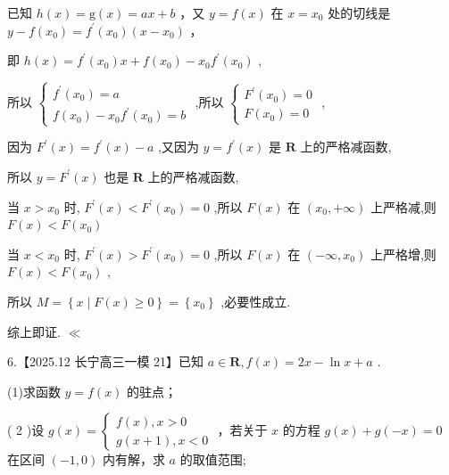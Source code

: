 \documentclass[10pt]{article}
\newcommand*\circled[1]{\tikz[baseline=(char.base)]{\node[shape=circle,draw,inner sep=1.5pt] (char) {\small #1};}}
\begin{document}
 \circled{2}  已知 \(h\left( x\right)  = \mathrm{g}\left( x\right)  = {ax} + b\) ，又 \(y = f\left( x\right)\) 在 \(x = {x}_{0}\) 处的切线是 \(y - f\left( {x}_{0}\right)  = {f}^{\prime }\left( {x}_{0}\right) \left( {x - {x}_{0}}\right)\) ，

即 \(h\left( x\right)  = {f}^{\prime }\left( {x}_{0}\right) x + f\left( {x}_{0}\right)  - {x}_{0}{f}^{\prime }\left( {x}_{0}\right)\) ,

所以 \(\left\{  \begin{array}{l} {f}^{\prime }\left( {x}_{0}\right)  = a \\  f\left( {x}_{0}\right)  - {x}_{0}{f}^{\prime }\left( {x}_{0}\right)  = b \end{array}\right.\) ,所以 \(\left\{  \begin{array}{l} {F}^{\prime }\left( {x}_{0}\right)  = 0 \\  F\left( {x}_{0}\right)  = 0 \end{array}\right.\) ,

因为 \({F}^{\prime }\left( x\right)  = {f}^{\prime }\left( x\right)  - a\) ,又因为 \(y = {f}^{\prime }\left( x\right)\) 是 \(\mathbf{R}\) 上的严格减函数,

所以 \(y = {F}^{\prime }\left( x\right)\) 也是 \(\mathbf{R}\) 上的严格减函数,

当 \(x > {x}_{0}\) 时, \({F}^{\prime }\left( x\right)  < {F}^{\prime }\left( {x}_{0}\right)  = 0\) ,所以 \(F\left( x\right)\) 在 \(\left( {{x}_{0}, + \infty }\right)\) 上严格减,则 \(F\left( x\right)  < F\left( {x}_{0}\right)\)

当 \(x < {x}_{0}\) 时, \({F}^{\prime }\left( x\right)  > {F}^{\prime }\left( {x}_{0}\right)  = 0\) ,所以 \(F\left( x\right)\) 在 \(\left( {-\infty ,{x}_{0}}\right)\) 上严格增,则 \(F\left( x\right)  < F\left( {x}_{0}\right)\) ,

所以 \(M = \left\{  {x \mid  F\left( x\right)  \geq  0}\right\}   = \left\{  {x}_{0}\right\}\) ,必要性成立.

综上即证. \(\ll\)

6.【2025.12 长宁高三一模 21】已知 \(a \in  \mathbf{R},f\left( x\right)  = {2x} - \ln x + a\) .

(1)求函数 \(y = f\left( x\right)\) 的驻点；

( 2 )设 \(g\left( x\right)  = \left\{  \begin{matrix} f\left( x\right) ,x > 0 \\  g\left( {x + 1}\right) ,x < 0 \end{matrix}\right.\) ，若关于 \(x\) 的方程 \(g\left( x\right)  + g\left( {-x}\right)  = 0\) 在区间 \(\left( {-1,0}\right)\) 内有解，求 \(a\) 的取值范围;
\end{document}
